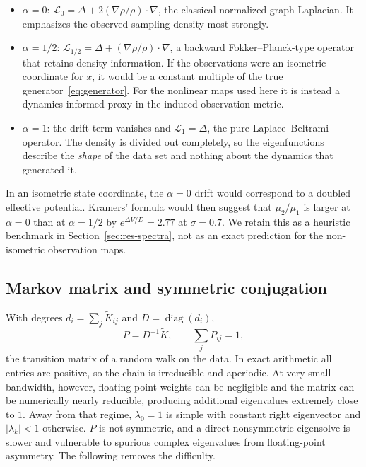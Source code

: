 \documentclass[11pt]{article}
\newcommand{\Kt}{\widetilde{K}}
\newcommand{\diag}{\operatorname{diag}}
\begin{document}
\begin{itemize}
\item $\alpha=0$: $\mathcal{L}_0 = \Delta + 2(\nabla\rho/\rho)\cdot\nabla$, the
classical normalized graph Laplacian. It emphasizes the observed sampling
density most strongly.
\item $\alpha=1/2$: $\mathcal{L}_{1/2} = \Delta + (\nabla\rho/\rho)\cdot\nabla$,
a backward Fokker--Planck-type operator that retains density information. If the
observations were an isometric coordinate for $x$, it would be a constant
multiple of the true generator~\eqref{eq:generator}. For the nonlinear maps used
here it is instead a dynamics-informed proxy in the induced observation metric.
\item $\alpha=1$: the drift term vanishes and $\mathcal{L}_1 = \Delta$, the pure
Laplace--Beltrami operator. The density is divided out completely, so the
eigenfunctions describe the \emph{shape} of the data set and nothing about the
dynamics that generated it.
\end{itemize}

In an isometric state coordinate, the $\alpha=0$ drift would correspond to a
doubled effective potential. Kramers' formula would then suggest that
$\mu_2/\mu_1$ is larger at $\alpha=0$ than at $\alpha=1/2$ by
$e^{\Delta V/D}=2.77$ at $\sigma=0.7$. We retain this as a heuristic benchmark in
Section~\ref{sec:res-spectra}, not as an exact prediction for the non-isometric
observation maps.

\subsection{Markov matrix and symmetric conjugation}

With degrees $d_i = \sum_j\Kt_{ij}$ and $D = \diag(d_i)$,
\begin{equation}
P = D^{-1}\Kt , \qquad \sum_j P_{ij} = 1 ,
\label{eq:markov}
\end{equation}
the transition matrix of a random walk on the data. In exact arithmetic all
entries are positive, so the chain is irreducible and aperiodic. At very small
bandwidth, however, floating-point weights can be negligible and the matrix can
be numerically nearly reducible, producing additional eigenvalues extremely close
to $1$. Away from that regime, $\lambda_0 = 1$ is simple with constant right
eigenvector and $\lvert\lambda_k\rvert<1$ otherwise. $P$ is
not symmetric, and a direct nonsymmetric eigensolve is slower and vulnerable to
spurious complex eigenvalues from floating-point asymmetry. The following removes
the difficulty.
\end{document}
